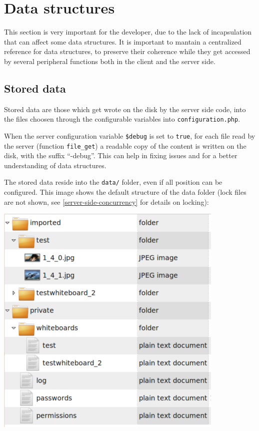 \documentclass[10pt,a4paper,english]{book}
\begin{document}

\hypertarget{data-structures}{}
\chapter{Data structures}
\label{data-structures}

This section is very important for the developer, due to the lack of
incapsulation that can affect some data structures. It is important to
mantain a centralized reference for data structures, to preserve their
coherence while they get accessed by several peripheral functions
both in the client and the server side.



\hypertarget{stored-data}{}
\section{Stored data}
\label{stored-data}

Stored data are those which get wrote on the disk by the server side
code, into the files choosen through the configurable variables into
\texttt{configuration.php}.

When the server configuration variable \texttt{{\$}debug} is set to \texttt{true},
for each file read by the server (function \texttt{file{\_}get}) a readable
copy of the content is written on the disk, with the suffix
``-debug''. This can help in fixing issues and for a better
understanding of data structures.

The stored data reside into the \texttt{data/} folder, even if all position
can be configured. This image shows the default structure of the data
folder (lock files are not shown, see \href{\#server-side-concurrency}{\ref*{server-side-concurrency}} for
details on locking):

\includegraphics{images/default_structure_data_folder.png}
\end{document}
